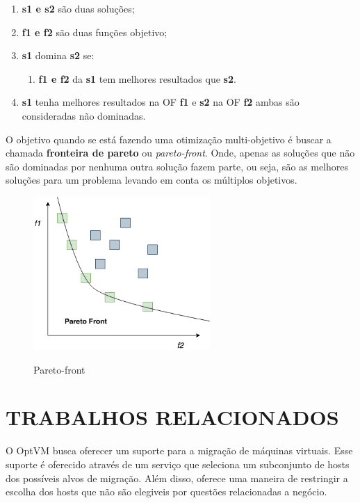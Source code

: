 \begin{enumerate}
  \item \textbf{s1 e s2} são duas soluções;
  \item \textbf{f1 e f2} são duas funções objetivo;
  \item \textbf{s1} domina \textbf{s2} se:
    \begin{enumerate}
      \item \textbf{f1 e f2} da \textbf{s1} tem melhores resultados que \textbf{s2}.
    \end{enumerate}
  \item \textbf{s1} tenha melhores resultados na OF \textbf{f1} e \textbf{s2} na OF \textbf{f2}
  ambas são consideradas não dominadas.
\end{enumerate}

O objetivo quando se está fazendo uma otimização multi-objetivo é buscar
a chamada \textbf{fronteira de pareto} ou \textit{pareto-front}. Onde, apenas
as soluções que não são dominadas por nenhuma outra solução fazem parte, ou seja,
são as melhores soluções para um problema levando em conta os múltiplos objetivos.

\begin{figure}[!htb]
  \centering
  \caption{Pareto-front}
  \includegraphics[width=0.6\textwidth]{./dados/figuras/pareto-front.png}
  \label{fig:paretofront}
\end{figure}

\section{TRABALHOS RELACIONADOS}
O OptVM busca oferecer um suporte para a migração de máquinas virtuais. Esse
suporte é oferecido através de um serviço que seleciona um subconjunto de hosts 
dos possíveis alvos de migração. Além disso, oferece uma maneira de restringir
a escolha dos hosts que não são elegiveis por questões relacionadas a negócio.

